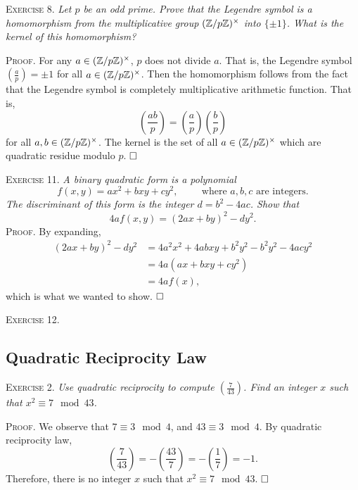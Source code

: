 \documentclass[11pt, leqno]{article}
\newcommand{\done}{\ensuremath{\hfill\square}}
\begin{document}
\textsc{Exercise 8}. \emph{Let $p$ be an odd prime. Prove that the Legendre symbol is a homomorphism from the multiplicative group $(\mathbb{Z}/p\mathbb{Z})^{\times}$ into $\{\pm 1\}$. What is the kernel of this homomorphism?}

\textsc{Proof}. For any $a\in (\mathbb{Z}/p\mathbb{Z})^{\times}$, $p$ does not divide $a$. That is, the Legendre symbol $\left( \frac{a}{p} \right) = \pm 1$ for all $a\in (\mathbb{Z}/p\mathbb{Z})^{\times}$. Then the homomorphism follows from the fact that the Legendre symbol is completely multiplicative arithmetic function. That is, 
\begin{displaymath}
\left( \frac{ab}{p} \right) = \left( \frac{a}{p} \right) \left( \frac{b}{p} \right)
\end{displaymath}
for all $a,b \in (\mathbb{Z}/p\mathbb{Z})^{\times}$. The kernel is the set of all $a\in (\mathbb{Z}/p\mathbb{Z})^{\times}$ which are quadratic residue modulo $p$. \done

\textsc{Exercise 11}. \emph{A binary quadratic form is a polynomial 
\begin{displaymath}
f(x,y) = ax^2 + bxy + cy^2, \hspace{1cm} \text{where $a, b, c$ are integers.}
\end{displaymath}
The discriminant of this form is the integer $d = b^2 - 4ac$. Show that 
\begin{displaymath}
4af(x,y) = (2ax + by)^2 - dy^2.
\end{displaymath}}\textsc{Proof}. By expanding, 
\begin{align*}
  (2ax + by)^2 - dy^2 &= 4a^2x^2 + 4abxy + b^2y^2 - b^2y^2 - 4acy^2 \\
                      &= 4a(ax + bxy + cy^2) \\
                      &= 4af(x),
\end{align*}
which is what we wanted to show. \done

\textsc{Exercise 12.} \emph{}

\subsection{Quadratic Reciprocity Law}

\textsc{Exercise 2}. \emph{Use quadratic reciprocity to compute $\left( \frac{7}{43} \right)$. Find an integer $x$ such that $x^2 \equiv 7 \mod 43$.}

\textsc{Proof}. We observe that $7 \equiv 3 \mod 4$, and $43 \equiv 3 \mod 4$. By quadratic reciprocity law, 
\begin{displaymath}
\left( \frac{7}{43} \right) = -\left( \frac{43}{7} \right) = -\left( \frac{1}{7} \right) = -1.
\end{displaymath}
Therefore, there is no integer $x$ such that $x^2 \equiv 7 \mod 43$. \done
\end{document}
